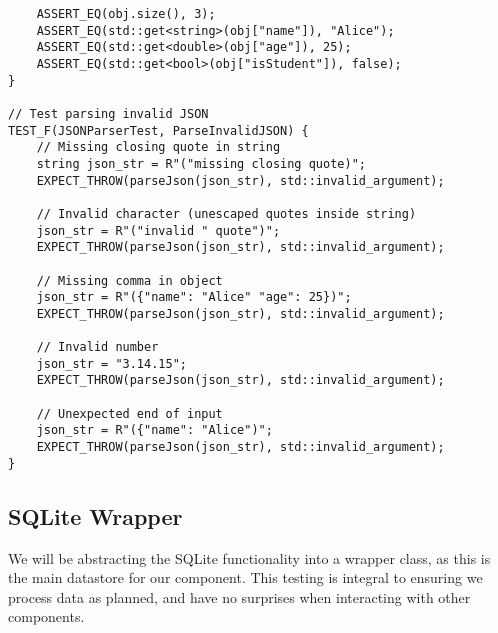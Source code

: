 \begin{verbatim}
    ASSERT_EQ(obj.size(), 3);
    ASSERT_EQ(std::get<string>(obj["name"]), "Alice");
    ASSERT_EQ(std::get<double>(obj["age"]), 25);
    ASSERT_EQ(std::get<bool>(obj["isStudent"]), false);
}

// Test parsing invalid JSON
TEST_F(JSONParserTest, ParseInvalidJSON) {
    // Missing closing quote in string
    string json_str = R"("missing closing quote)";
    EXPECT_THROW(parseJson(json_str), std::invalid_argument);

    // Invalid character (unescaped quotes inside string)
    json_str = R"("invalid " quote")";
    EXPECT_THROW(parseJson(json_str), std::invalid_argument);

    // Missing comma in object
    json_str = R"({"name": "Alice" "age": 25})";
    EXPECT_THROW(parseJson(json_str), std::invalid_argument);

    // Invalid number
    json_str = "3.14.15";
    EXPECT_THROW(parseJson(json_str), std::invalid_argument);

    // Unexpected end of input
    json_str = R"({"name": "Alice")";
    EXPECT_THROW(parseJson(json_str), std::invalid_argument);
}
\end{verbatim}

\subsection*{SQLite Wrapper}

We will be abstracting the SQLite functionality into a wrapper class, as this is the main datastore for our component. This testing is integral to ensuring we process data as planned, and have no surprises when interacting with other components.

